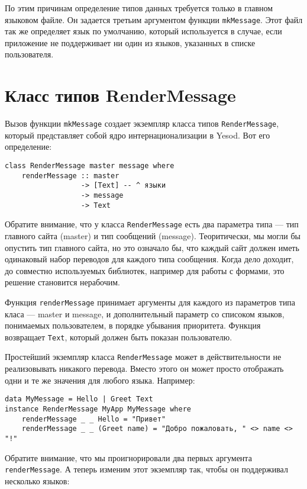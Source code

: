 По этим причинам определение типов данных требуется только в главном языковом файле. Он задается третьим аргументом функции \lstinline'mkMessage'. Этот файл так же определяет язык по умолчанию, который используется в случае, если приложение не поддерживает ни один из языков, указанных в списке пользователя.

\section{Класс типов RenderMessage} %

Вызов функции \lstinline'mkMessage' создает экземпляр класса типов \lstinline'RenderMessage', который представляет собой ядро интернационализации в Yesod. Вот его определение:

\begin{lstlisting}
class RenderMessage master message where
    renderMessage :: master
                  -> [Text] -- ^ языки
                  -> message
                  -> Text 
\end{lstlisting}

Обратите внимание, что у класса \lstinline'RenderMessage' есть два параметра типа --- тип главного сайта (master) и тип сообщений (message). Теоритически, мы могли бы опустить тип главного сайта, но это означало бы, что каждый сайт должен иметь одинаковый набор переводов для каждого типа сообщения. Когда дело доходит, до совместно используемых библиотек, например для работы с формами, это решение становится нерабочим.

Функция \lstinline'renderMessage' принимает аргументы для каждого из параметров типа класа --- master и message, и дополнительный параметр со списоком языков, понимаемых пользователем, в порядке убывания приоритета. Функция возвращает \lstinline'Text', который должен быть показан пользователю.

Простейший экземпляр класса \lstinline'RenderMessage' может в действительности не реализовывать никакого перевода. Вместо этого он может просто отображать одни и те же значения для любого языка. Например:

\begin{lstlisting}
data MyMessage = Hello | Greet Text
instance RenderMessage MyApp MyMessage where
    renderMessage _ _ Hello = "Привет"
    renderMessage _ _ (Greet name) = "Добро пожаловать, " <> name <> "!"
\end{lstlisting}
    
Обратите внимание, что мы проигнорировали два первых аргумента \lstinline'renderMessage'. А теперь изменим этот экземпляр так, чтобы он поддерживал несколько языков:

